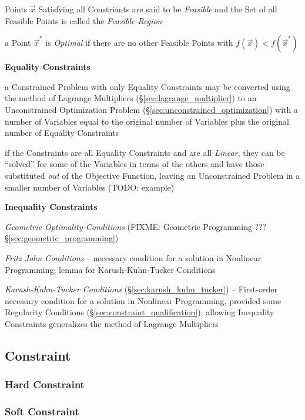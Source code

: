 Points $\vec{x}$ Satisfying all Constriants are said to be \emph{Feasible}
and the Set of all Feasible Points is called the \emph{Feasible Region}

a Point $\vec{x}^*$ is \emph{Optimal} if there are no other Feasible Points
with $f(\vec{x}) < f(\vec{x}^*)$


\textbf{Equality Constraints}

a Constrained Problem with only Equality Constraints may be converted using the
method of Lagrange Multipliers (\S\ref{sec:lagrange_multiplier}) to an
Unconstrained Optimization Problem (\S\ref{sec:unconstrained_optimization})
with a number of Variables equal to the original number of Variables plus the
original number of Equality Constraints

if the Constraints are all Equality Constraints and are all \emph{Linear}, they
can be ``solved'' for some of the Variables in terms of the others and have
those substituted \emph{out} of the Objective Function, leaving an
Unconstrained Problem in a smaller number of Variables (TODO: example)


\textbf{Inequality Constraints}

\emph{Geometric Optimality Conditions} (FIXME: Geometric Programming ???
\S\ref{sec:geometric_programming})

\emph{Fritz John Conditions} -- necessary condition for a solution in Nonlinear
Programming; lemma for Karush-Kuhn-Tucker Conditions

\emph{Karush-Kuhn-Tucker Conditions} (\S\ref{sec:karush_kuhn_tucker}) --
First-order necessary condition for a solution in Nonlinear Programming,
provided some Regularity Conditions (\S\ref{sec:constraint_qualification});
allowing Inequality Constraints generalizes the method of Lagrange Multipliers



\subsection{Constraint}\label{sec:constraint}

\subsubsection{Hard Constraint}\label{sec:hard_constraint}

\subsubsection{Soft Constraint}\label{sec:soft_constraint}



